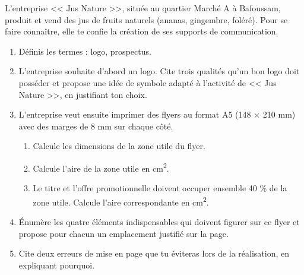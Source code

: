 \documentclass[11pt]{article}
\begin{document}
\begin{exercice}
L'entreprise << Jus Nature >>, située au quartier Marché A à Bafoussam, produit et vend des jus de fruits naturels (ananas, gingembre, foléré). Pour se faire connaître, elle te confie la création de ses supports de communication.

\begin{enumerate}
\item Définis les termes : logo, prospectus.
\item L'entreprise souhaite d'abord un logo. Cite trois qualités qu'un bon logo doit posséder et propose une idée de symbole adapté à l'activité de << Jus Nature >>, en justifiant ton choix.
\item L'entreprise veut ensuite imprimer des flyers au format A5 (148 $\times$ 210 mm) avec des marges de 8 mm sur chaque côté.
\begin{enumerate}
\item Calcule les dimensions de la zone utile du flyer.
\item Calcule l'aire de la zone utile en cm\textsuperscript{2}.
\item Le titre et l'offre promotionnelle doivent occuper ensemble 40 \% de la zone utile. Calcule l'aire correspondante en cm\textsuperscript{2}.
\end{enumerate}
\item Énumère les quatre éléments indispensables qui doivent figurer sur ce flyer et propose pour chacun un emplacement justifié sur la page.
\item Cite deux erreurs de mise en page que tu éviteras lors de la réalisation, en expliquant pourquoi.
\end{enumerate}
\end{exercice}
\end{document}
